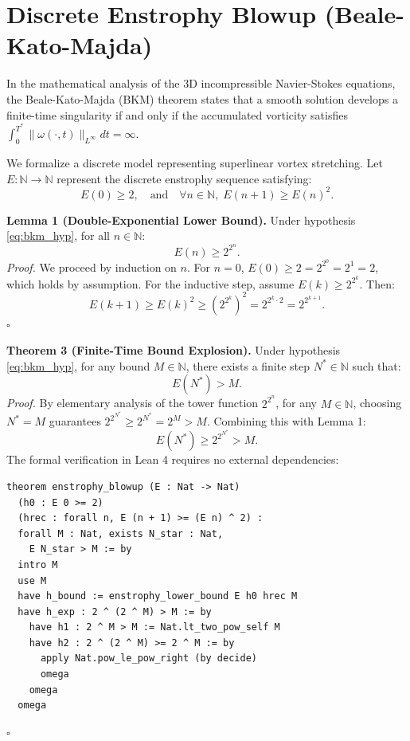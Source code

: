\documentclass[10pt,twocolumn,a4paper]{article}
\newenvironment{proof}{\noindent\textit{Proof.}}{\hfill$\square$\vspace{0.2cm}}
\begin{document}
\section{Discrete Enstrophy Blowup (Beale-Kato-Majda)}
In the mathematical analysis of the 3D incompressible Navier-Stokes equations, the Beale-Kato-Majda (BKM) theorem \cite{beale1984} states that a smooth solution develops a finite-time singularity if and only if the accumulated vorticity satisfies $\int_0^{T^*} \|\omega(\cdot, t)\|_{L^\infty} dt = \infty$. 

We formalize a discrete model representing superlinear vortex stretching. Let $E : \mathbb{N} \to \mathbb{N}$ represent the discrete enstrophy sequence satisfying:
\begin{equation}
E(0) \ge 2, \quad \text{and} \quad \forall n \in \mathbb{N},\; E(n+1) \ge E(n)^2.
\label{eq:bkm_hyp}
\end{equation}

\noindent\textbf{Lemma 1 (Double-Exponential Lower Bound).}
Under hypothesis \eqref{eq:bkm_hyp}, for all $n \in \mathbb{N}$:
\begin{equation}
E(n) \ge 2^{2^n}.
\label{eq:double_exp}
\end{equation}
\begin{proof}
We proceed by induction on $n$.
For $n = 0$, $E(0) \ge 2 = 2^{2^0} = 2^1 = 2$, which holds by assumption.
For the inductive step, assume $E(k) \ge 2^{2^k}$. Then:
\begin{equation}
E(k+1) \ge E(k)^2 \ge \left(2^{2^k}\right)^2 = 2^{2^k \cdot 2} = 2^{2^{k+1}}.
\end{equation}
\end{proof}

\noindent\textbf{Theorem 3 (Finite-Time Bound Explosion).}
Under hypothesis \eqref{eq:bkm_hyp}, for any bound $M \in \mathbb{N}$, there exists a finite step $N^* \in \mathbb{N}$ such that:
\begin{equation}
E(N^*) > M.
\end{equation}
\begin{proof}
By elementary analysis of the tower function $2^{2^n}$, for any $M \in \mathbb{N}$, choosing $N^* = M$ guarantees $2^{2^{N^*}} \ge 2^{N^*} = 2^M > M$. Combining this with Lemma 1:
\begin{equation}
E(N^*) \ge 2^{2^{N^*}} > M.
\end{equation}
The formal verification in Lean 4 requires no external dependencies:
\begin{verbatim}
theorem enstrophy_blowup (E : Nat -> Nat)
  (h0 : E 0 >= 2)
  (hrec : forall n, E (n + 1) >= (E n) ^ 2) :
  forall M : Nat, exists N_star : Nat, 
    E N_star > M := by
  intro M
  use M
  have h_bound := enstrophy_lower_bound E h0 hrec M
  have h_exp : 2 ^ (2 ^ M) > M := by
    have h1 : 2 ^ M > M := Nat.lt_two_pow_self M
    have h2 : 2 ^ (2 ^ M) >= 2 ^ M := by
      apply Nat.pow_le_pow_right (by decide)
      omega
    omega
  omega
\end{verbatim}
\end{proof}
\end{document}
